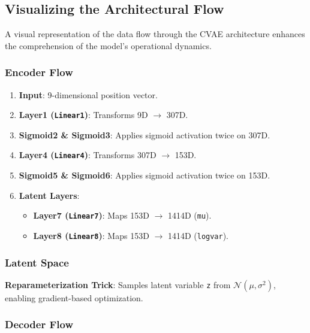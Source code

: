 \documentclass[10pt]{article}
\begin{document}
\subsection{Visualizing the Architectural Flow}

A visual representation of the data flow through the CVAE architecture enhances the comprehension of the model's operational dynamics.

\subsubsection{Encoder Flow}

\begin{enumerate}
    \item \textbf{Input}: 9-dimensional position vector.
    \item \textbf{Layer1 (\texttt{Linear1})}: Transforms 9D $\rightarrow$ 307D.
    \item \textbf{Sigmoid2 \& Sigmoid3}: Applies sigmoid activation twice on 307D.
    \item \textbf{Layer4 (\texttt{Linear4})}: Transforms 307D $\rightarrow$ 153D.
    \item \textbf{Sigmoid5 \& Sigmoid6}: Applies sigmoid activation twice on 153D.
    \item \textbf{Latent Layers}:
    \begin{itemize}
        \item \textbf{Layer7 (\texttt{Linear7})}: Maps 153D $\rightarrow$ 1414D (\texttt{mu}).
        \item \textbf{Layer8 (\texttt{Linear8})}: Maps 153D $\rightarrow$ 1414D (\texttt{logvar}).
    \end{itemize}
\end{enumerate}

\subsubsection{Latent Space}

\textbf{Reparameterization Trick}: Samples latent variable \texttt{z} from \( \mathcal{N}(\mu, \sigma^2) \), enabling gradient-based optimization.

\subsubsection{Decoder Flow}
\end{document}
